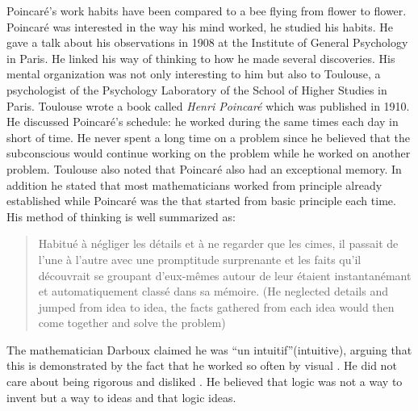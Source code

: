 \documentclass[12pt]{article}
\begin{document}
Poincar\'e's work habits have been compared to a bee flying from flower to flower.  Poincar\'e was interested in the way his mind worked, he studied his habits. He gave a talk about his observations in 1908 at the Institute of General Psychology in Paris.  He linked his way of thinking to how he made several discoveries.  His mental organization was not only interesting to him but also to Toulouse, a psychologist of the Psychology Laboratory of the School of Higher Studies in Paris.  Toulouse wrote a book called \emph{Henri Poincar\'e} which was published in 1910.  He discussed Poincar\'e's  schedule: he worked during the same times each day in short  of time.  He never spent a long time on a problem since he believed that the subconscious would continue working on the problem while he worked on another problem.  Toulouse also noted that Poincar\'e also had an exceptional memory.  In addition he stated that most mathematicians worked from principle already established while Poincar\'e was the  that started from basic principle each time.\cite{MT}  His method of thinking is well summarized as:
\begin{quote}
Habitu\'e \`a n\'egliger les d\'etails et \`a ne regarder que les cimes, il passait de l'une \`a l'autre avec une promptitude surprenante et les faits qu'il d\'ecouvrait se groupant d'eux-m\^emes autour de leur  \'etaient instantan\'emant et automatiquement class\'e dans sa m\'emoire. (He neglected details and jumped from idea to idea, the facts gathered from each idea would then come together and solve the problem) \cite{BA}
\end{quote}
The mathematician Darboux claimed he was ``un intuitif''(intuitive)\cite{BA}, arguing that this is demonstrated by the fact that he worked so often by visual .  He did not care about being rigorous and disliked . He believed that logic was not a way to invent but a way to  ideas and that logic  ideas.  
\end{document}
